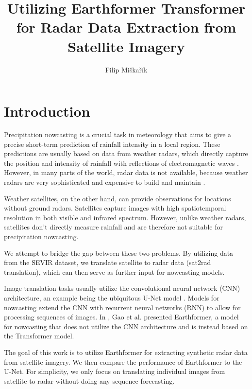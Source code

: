 \documentclass[english]{mvi-report}
\title{Utilizing Earthformer Transformer for Radar Data Extraction from Satellite Imagery}
\author{Filip Miškařík}
\affiliation{FIT ČVUT}
\begin{document}
\maketitle

\section{Introduction}
Precipitation nowcasting is a crucial task in meteorology that aims to give a precise short-term prediction of rainfall intensity in a local region. These predictions are usually based on data from weather radars, which directly capture the position and intensity of rainfall with reflections of electromagnetic waves \cite{radar_article}. However, in many parts of the world, radar data is not available, because weather radars are very sophisticated and expensive to build and maintain \cite{guildelines_for_nowcasting}.

Weather satellites, on the other hand, can provide observations for locations without ground radars. Satellites capture images with high spatiotemporal resolution in both visible and infrared spectrum. However, unlike weather radars, satellites don't directly measure rainfall and are therefore not suitable for precipitation nowcasting.

We attempt to bridge the gap between these two problems. By utilizing data from the SEVIR dataset, we translate satellite to radar data (sat2rad translation), which can then serve as further input for nowcasting models.

Image translation tasks usually utilize the convolutional neural network (CNN) architecture, an example being the ubiquitous U-Net model \cite{unet}. Models for nowcasting extend the CNN with recurrent neural networks (RNN) to allow for processing sequences of images. In \cite{earthformer}, Gao et al. presented Earthformer, a model for nowcasting that does not utilize the CNN architecture and is instead based on the Transformer model.

The goal of this work is to utilize Earthformer for extracting synthetic radar data from satellite imagery. We then compare the performance of Earthformer to the U-Net. For simplicity, we only focus on translating individual images from satellite to radar without doing any sequence forecasting.

\end{document}
